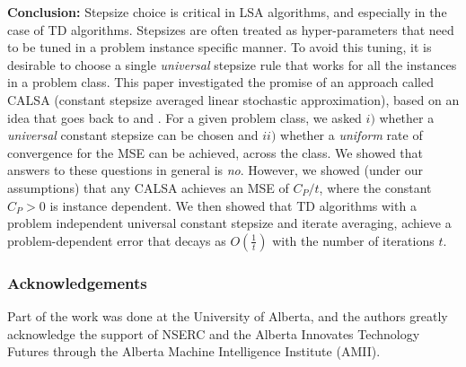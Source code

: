 \textbf{Conclusion:} 
Stepsize choice is critical in LSA algorithms, and especially in the case of TD algorithms.
Stepsizes are often treated as hyper-parameters that need to be tuned in a problem instance specific manner. To avoid this tuning, it is desirable to choose a single \emph{universal} stepsize rule that works for all the instances in a problem class. This paper investigated the promise of an approach called CALSA (constant stepsize averaged linear stochastic approximation), based on an idea that goes back to \citet{ruppert} and \citet{polyak-judisky}. For a given problem class, we asked $i)$ whether a \emph{universal} constant stepsize can be chosen and $ii)$ whether a \emph{uniform} rate of convergence for the MSE can be achieved, across the class. We showed that answers to these questions in general is \emph{no}. However, we showed (under our assumptions) that any CALSA achieves an MSE of $C_P/t$, where the constant $C_P>0$ is instance dependent. We then showed that TD algorithms with a problem independent universal constant stepsize and iterate averaging, achieve a problem-dependent error 
that decays as $O(\frac{1}{t})$ with the number of iterations $t$.
\subsubsection*{Acknowledgements}
Part of the work was done at the University of Alberta, and the authors greatly acknowledge the
support of NSERC and the Alberta Innovates Technology
Futures through the Alberta Machine Intelligence
Institute (AMII).